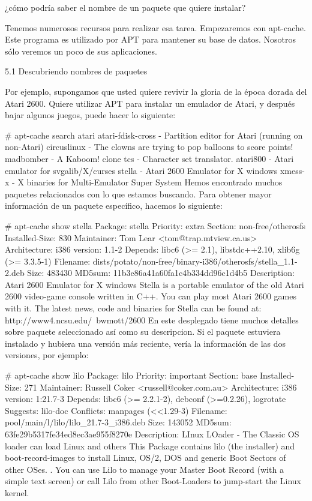 \documentclass[12pt]{article}
\begin{document}
 ¿cómo podría saber el nombre de un paquete que quiere instalar?

Tenemos numerosos recursos para realizar esa tarea. Empezaremos con apt-cache. Este programa es utilizado por APT para mantener su base de datos. Nosotros sólo veremos un poco de sus aplicaciones.

5.1 Descubriendo nombres de paquetes

Por ejemplo, supongamos que usted quiere revivir la gloria de la época dorada del Atari 2600. Quiere utilizar APT para instalar un emulador de Atari, y después bajar algunos juegos, puede hacer lo siguiente:

     # apt-cache search atari
     atari-fdisk-cross - Partition editor for Atari (running on non-Atari)
     circuslinux - The clowns are trying to pop balloons to score points!
     madbomber - A Kaboom! clone
     tcs - Character set translator.
     atari800 - Atari emulator for svgalib/X/curses
     stella - Atari 2600 Emulator for X windows
     xmess-x - X binaries for Multi-Emulator Super System
Hemos encontrado muchos paquetes relacionados con lo que estamos buscando. Para obtener mayor información de un paquete específico, hacemos lo siguiente:

     # apt-cache show stella
     Package: stella
     Priority: extra
     Section: non-free/otherosfs
     Installed-Size: 830
     Maintainer: Tom Lear <tom@trap.mtview.ca.us>
     Architecture: i386
     version: 1.1-2
     Depends: libc6 (>= 2.1), libstdc++2.10, xlib6g (>= 3.3.5-1)
     Filename: dists/potato/non-free/binary-i386/otherosfs/stella_1.1-2.deb
     Size: 483430
     MD5sum: 11b3e86a41a60fa1c4b334dd96c1d4b5
     Description: Atari 2600 Emulator for X windows
      Stella is a portable emulator of the old Atari 2600 video-game console
      written in C++. You can play most Atari 2600 games with it. The latest
      news, code and binaries for Stella can be found at:
      http://www4.ncsu.edu/~bwmott/2600
En este desplegado tiene muchos detalles sobre paquete seleccionado así como su descripcion. Si el paquete estuviera instalado y hubiera una versión más reciente, vería la información de las dos versiones, por ejemplo:

     # apt-cache show lilo
     Package: lilo
     Priority: important
     Section: base
     Installed-Size: 271
     Maintainer: Russell Coker <russell@coker.com.au>
     Architecture: i386
     version: 1:21.7-3
     Depends: libc6 (>= 2.2.1-2), debconf (>=0.2.26), logrotate
     Suggests: lilo-doc
     Conflicts: manpages (<<1.29-3)
     Filename: pool/main/l/lilo/lilo_21.7-3_i386.deb
     Size: 143052
     MD5sum: 63fe29b5317fe34ed8ec3ae955f8270e
     Description: LInux LOader - The Classic OS loader can load Linux and others
      This Package contains lilo (the installer) and boot-record-images to
      install Linux, OS/2, DOS and generic Boot Sectors of other OSes.
      .
      You can use Lilo to manage your Master Boot Record (with a simple text screen)
      or call Lilo from other Boot-Loaders to jump-start the Linux kernel.
     
\end{document}
